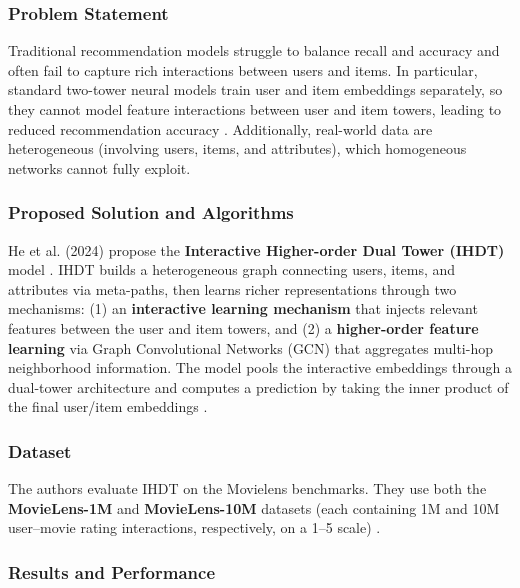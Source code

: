 \subsubsection{Problem Statement}

Traditional recommendation models struggle to balance recall and accuracy and often fail to capture rich interactions between users and items. In particular, standard two-tower neural models train user and item embeddings separately, so they cannot model feature interactions between user and item towers, leading to reduced recommendation accuracy \cite{he2024graph}. Additionally, real-world data are heterogeneous (involving users, items, and attributes), which homogeneous networks cannot fully exploit.



\subsubsection{Proposed Solution and Algorithms}

He et al. (2024) propose the \textbf{Interactive Higher-order Dual Tower (IHDT)} model \cite{he2024graph}. IHDT builds a heterogeneous graph connecting users, items, and attributes via meta-paths, then learns richer representations through two mechanisms: (1) an \textbf{interactive learning mechanism} that injects relevant features between the user and item towers, and (2) a \textbf{higher-order feature learning} via Graph Convolutional Networks (GCN) that aggregates multi-hop neighborhood information. The model pools the interactive embeddings through a dual-tower architecture and computes a prediction by taking the inner product of the final user/item embeddings \cite{he2024graph}.



\subsubsection{Dataset}

The authors evaluate IHDT on the Movielens benchmarks. They use both the \textbf{MovieLens-1M} and \textbf{MovieLens-10M} datasets (each containing 1M and 10M user–movie rating interactions, respectively, on a 1–5 scale) \cite{he2024graph}.



\subsubsection{Results and Performance}

